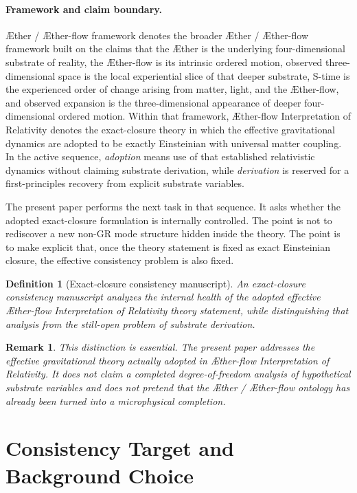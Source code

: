 \documentclass[11pt]{article}
\newcommand{\Aether}{\AE{}ther}
\newcommand{\Aflow}{\AE{}ther-flow}
\newcommand{\TheoryName}{\Aflow{} Interpretation of Relativity}
\newcommand{\TheoryProgram}{\Aether{} / \Aflow{} framework}
\newtheorem{definition}{Definition}
\newtheorem{remark}{Remark}
\begin{document}
\paragraph{Framework and claim boundary.}
\TheoryProgram{} denotes the broader \Aether{} / \Aflow{} framework built on the claims that the \Aether{} is the underlying four-dimensional substrate of reality, the \Aflow{} is its intrinsic ordered motion, observed three-dimensional space is the local experiential slice of that deeper substrate, S-time is the experienced order of change arising from matter, light, and the \Aflow{}, and observed expansion is the three-dimensional appearance of deeper four-dimensional ordered motion. Within that framework, \TheoryName{} denotes the exact-closure theory in which the effective gravitational dynamics are adopted to be exactly Einsteinian with universal matter coupling. In the active sequence, \emph{adoption} means use of that established relativistic dynamics without claiming substrate derivation, while \emph{derivation} is reserved for a first-principles recovery from explicit substrate variables.

The present paper performs the next task in that sequence. It asks whether the adopted exact-closure formulation is internally controlled. The point is not to rediscover a new non-GR mode structure hidden inside the theory. The point is to make explicit that, once the theory statement is fixed as exact Einsteinian closure, the effective consistency problem is also fixed.

\begin{definition}[Exact-closure consistency manuscript]
An exact-closure consistency manuscript analyzes the internal health of the adopted effective \TheoryName{} theory statement, while distinguishing that analysis from the still-open problem of substrate derivation.
\end{definition}

\begin{remark}
This distinction is essential. The present paper addresses the effective gravitational theory actually adopted in \TheoryName{}. It does not claim a completed degree-of-freedom analysis of hypothetical substrate variables and does not pretend that the \Aether{} / \Aflow{} ontology has already been turned into a microphysical completion.
\end{remark}

\section{Consistency Target and Background Choice}
\end{document}
